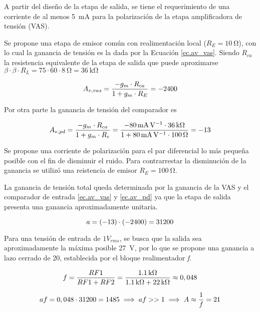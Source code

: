 	A partir del diseño de la etapa de salida, se tiene el requerimiento de una corriente de al menos \SI{5}{\milli\ampere} para la polarización de la etapa amplificadora de tensión (VAS).

Se propone una etapa de emisor común con realimentación local ($R_E = \SI{10}{\ohm}$), con lo cual la ganancia de tensión es la dada por la Ecuación \eqref{ec.av_vas}. Siendo $R_{ca}$ la resistencia equivalente de la etapa de salida que puede aproximarse $\beta \cdot \beta \cdot R_L = 75 \cdot 60 \cdot \SI{8}{\ohm} = \SI{36}{\kilo\ohm}$

\begin{equation}
	\centering
	A_{v,vas} = \frac{-g_m \cdot R_{ca}}{1+g_m \cdot R_E} = -2400
	\label{ec.av_vas}
\end{equation}
	

Por otra parte la ganancia de tensión del comparador es

\begin{equation}
	\centering
	A_{v,pd} = \frac{-g_m \cdot R_{ca}}{1+g_m \cdot R_e} = \frac{\SI{-80}{\mA\per\V} \cdot \SI{36}{\kilo\ohm} }{ 1 + \SI{80}{\mA\per\V} \cdot \SI{100}{\ohm} } = -13
	\label{ec.av_pd}
\end{equation}

Se propone una corriente de polarización para el par diferencial lo más pequeña posible con el fin de disminuir el ruido. Para contrarrestar la disminución de la ganancia se utilizó una reistencia de emisor $R_E=\SI{100}{\ohm}$.


La ganancia de tensión total queda determinada por la ganancia de la VAS y el comparador de entrada \eqref{ec.av_vas} y \eqref{ec.av_pd} ya que la etapa de salida presenta una ganancia aproximadamente unitaria.

\begin{equation}
	\centering
	a = (-13) \cdot (-2400) = 31200
	\label{ec.a}
\end{equation}

Para una tensión de entrada de $1V_{rms}$, se busca que la salida sea aproximadamente la máxima posible \SI{27}{\volt}, por lo que se propone una ganancia a lazo cerrado de 20, establecida por el bloque realimentador \textit{f}.

\begin{equation}
	\centering
	f = \frac{RF1}{RF1 + RF2} = \frac{\SI{1.1}{\kilo\ohm}}{\SI{1.1}{\kilo\ohm} + \SI{22}{\kilo\ohm}} \approx 0,048
\end{equation}

\begin{equation}
	\centering
	af = 0,048 \cdot 31200 = 1485 \implies af >> 1 \implies A \approx \frac{1}{f} = 21
\end{equation}

